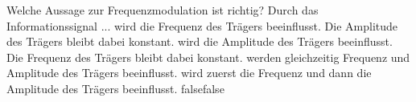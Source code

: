     {Welche Aussage zur Frequenzmodulation ist richtig? Durch das Informationssignal ...}
    {wird die Frequenz des Trägers beeinflusst. Die Amplitude des Trägers bleibt dabei konstant.}
    {wird die Amplitude des Trägers beeinflusst. Die Frequenz des Trägers bleibt dabei konstant. }
    {werden gleichzeitig Frequenz und Amplitude des Trägers beeinflusst.}
    {wird zuerst die Frequenz und dann die Amplitude des Trägers beeinflusst.}
    {false}{false}
